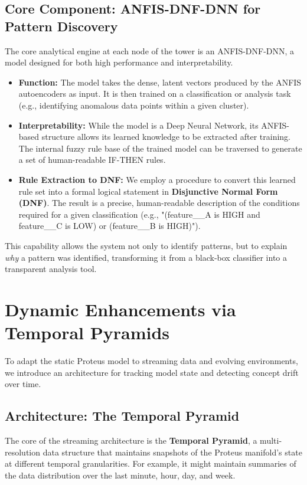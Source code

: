 \documentclass{article}
\begin{document}
\subsection{Core Component: ANFIS-DNF-DNN for Pattern Discovery}
The core analytical engine at each node of the tower is an ANFIS-DNF-DNN, a model designed for both high performance and interpretability.
\begin{itemize}
    \item \textbf{Function:} The model takes the dense, latent vectors produced by the ANFIS autoencoders as input. It is then trained on a classification or analysis task (e.g., identifying anomalous data points within a given cluster).
    \item \textbf{Interpretability:} While the model is a Deep Neural Network, its ANFIS-based structure allows its learned knowledge to be extracted after training. The internal fuzzy rule base of the trained model can be traversed to generate a set of human-readable IF-THEN rules.
    \item \textbf{Rule Extraction to DNF:} We employ a procedure to convert this learned rule set into a formal logical statement in \textbf{Disjunctive Normal Form (DNF)}. The result is a precise, human-readable description of the conditions required for a given classification (e.g., "(feature_\_A is HIGH and feature_\_C is LOW) or (feature_\_B is HIGH)").
\end{itemize}
This capability allows the system not only to identify patterns, but to explain \textit{why} a pattern was identified, transforming it from a black-box classifier into a transparent analysis tool.

\section{Dynamic Enhancements via Temporal Pyramids}

To adapt the static Proteus model to streaming data and evolving environments, we introduce an architecture for tracking model state and detecting concept drift over time.

\subsection{Architecture: The Temporal Pyramid}
The core of the streaming architecture is the \textbf{Temporal Pyramid}, a multi-resolution data structure that maintains snapshots of the Proteus manifold's state at different temporal granularities. For example, it might maintain summaries of the data distribution over the last minute, hour, day, and week.
\end{document}
